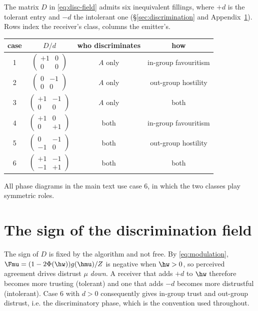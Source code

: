 The matrix $D$ in \eqref{eq:disc-field} admits six inequivalent fillings, where
$+d$ is the tolerant entry and $-d$ the intolerant one (\S\ref{sec:discrimination}
and Appendix~\ref{app:sign}). Rows index the receiver's class, columns the
emitter's.

\newcommand{\dmat}[4]{\left(\begin{smallmatrix}#1&#2\\#3&#4\end{smallmatrix}\right)}

\begin{table}[h]
\centering\small
\begin{tabular}{cccc}
\toprule
case & $D/d$ & who discriminates & how \\
\midrule
1 & $\dmat{+1}{0}{0}{0}$   & $A$ only & in-group favouritism \\
2 & $\dmat{0}{-1}{0}{0}$   & $A$ only & out-group hostility \\
3 & $\dmat{+1}{-1}{0}{0}$  & $A$ only & both \\
4 & $\dmat{+1}{0}{0}{+1}$  & both     & in-group favouritism \\
5 & $\dmat{0}{-1}{-1}{0}$  & both     & out-group hostility \\
6 & $\dmat{+1}{-1}{-1}{+1}$ & both    & both \\
\bottomrule
\end{tabular}
\end{table}

All phase diagrams in the main text use case 6, in which the two classes play
symmetric roles.

\section{The sign of the discrimination field}
\label{app:sign}

The sign of $D$ is fixed by the algorithm and not free. By \eqref{eq:modulation},
$\Fmu=(1-2\Phi(\hw))g(\hmu)/Z$ is negative when $\hw>0$, so perceived agreement
drives distrust $\mu$ \emph{down}. A receiver that adds $+d$ to $\hw$ therefore
becomes more trusting (tolerant) and one that adds $-d$ becomes more distrustful
(intolerant). Case 6 with $d>0$ consequently gives in-group trust and out-group
distrust, i.e. the discriminatory phase, which is the convention used throughout.

